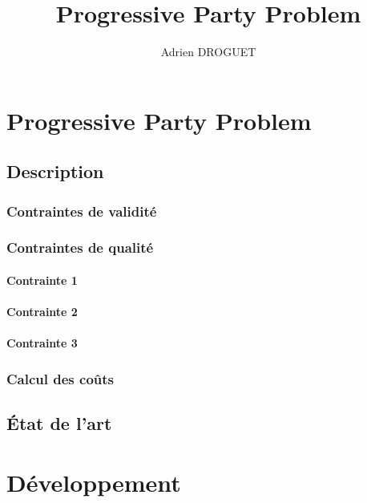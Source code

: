 \documentclass[a4paper,10pt]{report}
\title{Progressive Party Problem}
\author{Adrien DROGUET}
\begin{document}
\maketitle

\tableofcontents
\pagebreak


\chapter{Progressive Party Problem}
\section{Description}


\subsection{Contraintes de validité}

\subsection{Contraintes de qualité}
\subsubsection{Contrainte 1}

\subsubsection{Contrainte 2}

\subsubsection{Contrainte 3}

\subsection{Calcul des coûts}



\pagebreak
\section{État de l'art}

\pagebreak
\chapter{Développement}
\end{document}
